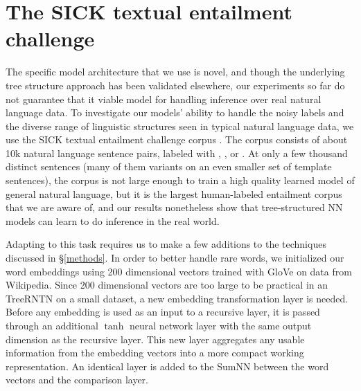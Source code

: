 \section{The SICK textual entailment challenge}\label{sec:sick}


The specific model architecture that we use is novel, and though the underlying tree structure approach has been validated elsewhere, our experiments so far do not guarantee that it viable model for handling inference over real
natural language data. To investigate our models' ability to handle the noisy labels and the diverse range of linguistic structures seen in typical natural language data, we use the SICK textual entailment challenge corpus \cite{marelli2014sick}. The corpus consists of about 10k natural language sentence pairs, labeled with , , or . At only a few thousand distinct sentences (many of them variants on an even smaller set of template sentences), the corpus is not large enough to train a high quality learned model of general natural language, but it is the largest human-labeled entailment corpus that we are aware of, and our results nonetheless show that tree-structured NN models can learn to do inference in the real world.

Adapting to this task requires us to make a few additions to the techniques discussed in \S\ref{methods}. In order to better handle rare words, we initialized our word embeddings using 200 dimensional vectors trained with 
GloVe \cite{pennington2014glove} on data from Wikipedia. Since 200 dimensional vectors are too large to be practical in an TreeRNTN on a small dataset, a new embedding transformation layer is needed. Before any embedding is used as an input to a recursive layer, it is passed through an additional $\tanh$ neural network layer with the same output dimension as the recursive layer. This new layer aggregates any usable information from the embedding vectors into a more compact working representation. An identical layer is added to the SumNN between the word vectors and the comparison layer.


